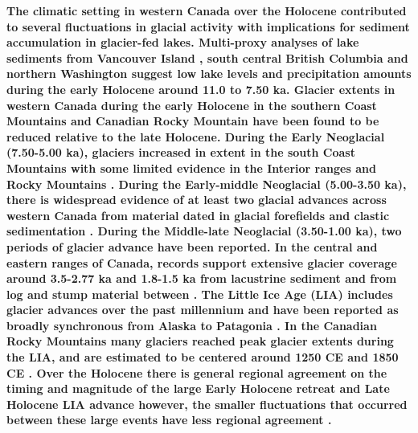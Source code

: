 \documentclass[Royal,times,doublespace,sageh]{sagej}
\begin{document}
\textbf{The climatic setting in western Canada over the Holocene
contributed to several fluctuations in glacial activity with
implications for sediment accumulation in glacier-fed lakes. Multi-proxy
analyses of lake sediments from Vancouver Island \citep{Brown2006},
south central British Columbia \citep{Lowe1997} and northern Washington
\citep{Steinman2019} suggest low lake levels and precipitation amounts
during the early Holocene around 11.0 to 7.50 ka. Glacier extents in
western Canada during the early Holocene in the southern Coast Mountains
\citep{Menounos2004, Koch2007a, Osborn2007} and Canadian Rocky Mountain
\citep{Luckman1988, Luckman1993} have been found to be reduced relative
to the late Holocene. During the Early Neoglacial (7.50-5.00 ka),
glaciers increased in extent in the south Coast Mountains
\citep{Osborn2007, Filippelli2006, Ryder1986} with some limited evidence
in the Interior ranges and Rocky Mountains \citep{Luckman1993}. During
the Early-middle Neoglacial (5.00-3.50 ka), there is widespread evidence
of at least two glacial advances across western Canada from material
dated in glacial forefields and clastic sedimentation
\citep{Koch2007a, Osborn2007, Menounos2008c, Gardner1985, Wood2004, Hodder2006b, Desloges1999, Leonard1999}.
During the Middle-late Neoglacial (3.50-1.00 ka), two periods of glacier
advance have been reported. In the central and eastern ranges of Canada,
records support extensive glacier coverage around 3.5-2.77 ka and
1.8-1.5 ka from lacustrine sediment
\citep{Leonard1999, Leonard1997, Dirszowsky1997a, Desloges1999} and from
log and stump material between
\citep{Wood2004, Luckman1995, Luckman1999}. The Little Ice Age (LIA)
includes glacier advances over the past millennium and have been
reported as broadly synchronous from Alaska to Patagonia
\citep{Luckman2000e}. In the Canadian Rocky Mountains many glaciers
reached peak glacier extents during the LIA, and are estimated to be
centered around 1250 CE \citep{Luckman1995, Osborn2001, Leonard1997} and
1850 CE \citep{Luckman2000e, Leonard1997}. Over the Holocene there is
general regional agreement on the timing and magnitude of the large
Early Holocene retreat and Late Holocene LIA advance however, the
smaller fluctuations that occurred between these large events have less
regional agreement \citep{Menounos2009b}. }
\end{document}

